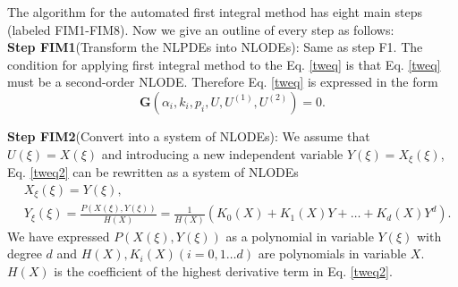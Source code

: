 \documentclass[prd,aps,floats,showkeys,nofootinbib,notitlepage]{revtex4-2}
\begin{document}
	The algorithm for the automated first integral method has eight main steps (labeled FIM1-FIM8). Now we give an outline of every step as follows:\\
	
	\textbf{Step FIM1}(Transform the NLPDEs into NLODEs): Same as step F1. The condition for applying first integral method to the Eq. \eqref{tweq} is that Eq. \eqref{tweq} must be a second-order NLODE. Therefore Eq. \eqref{tweq} is expressed in the form
	\begin{equation}\label{tweq2}
		\mathbf{G} \left( {\alpha_i,k_i,p_i,U,U^{(1)},U^{(2)}} \right) = 0.
	\end{equation}
	
	\textbf{Step FIM2}(Convert into a system of NLODEs): We assume that $U(\xi)=X(\xi)$ and introducing a new independent variable $Y(\xi) = X_{\xi}(\xi)$, Eq. \eqref{tweq2} can be rewritten as a system of NLODEs \cite{fim0}
	\begin{subequations}\label{sysode}
		\begin{align}
			&X_{\xi}(\xi)= Y(\xi),\label{sysode1}\\
			&Y_{\xi}(\xi)= \frac{P(X(\xi),Y(\xi))}{H(X)} = \frac{1}{H(X)}\left(K_0(X)+K_1(X)Y+\ldots+K_d(X)Y^d\right)\label{sysode2}.
		\end{align}
	\end{subequations}
	We have expressed $P(X(\xi),Y(\xi))$ as a polynomial in variable $Y(\xi)$ with degree $d$ and $H(X),K_i(X)(i=0,1\ldots d)$ are polynomials in variable $X$.
	$H(X)$ is the coefficient of the highest derivative term in Eq. \eqref{tweq2}.\\
	
\end{document}
